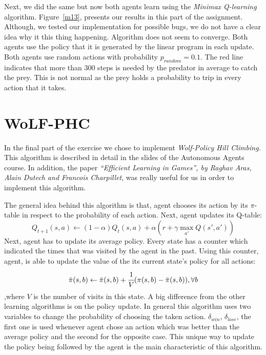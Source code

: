 \documentclass[a4paper,11pt]{article}
\begin{document}
Next, we did the same but now both agents learn using the \textit{Minimax Q-learning} algorithm. Figure~\ref{m13},  presents our results in this part of the assignment. Although, we tested our implementation for possible bugs, we do not have a clear idea why it this thing happening. Algorithm does not seem to converge. Both agents use the policy that it is generated by the linear program in each update. Both agents use random actions with probability $p_{random} = 0.1$. The red line indicates that more than 300 steps is needed by the predator in average to catch the prey. This is not normal as the prey holds a probability to trip in every action that it takes.


\section{WoLF-PHC}
In the final part of the exercise we chose to implement \textit{Wolf-Policy Hill Climbing}. This algorithm is described in detail in the slides of the Autonomous Agents course. In addition, the paper \textit{``Efficient Learning in Games'', by Raghav Aras, Alain Dutech and Francois Charpillet}, was really useful for us in order to implement this algorithm.

The general idea behind this algorithm is that, agent chooses its action by its $\pi$-table in respect to the probability of each action. Next, agent updates its Q-table:
\[
Q_{t+1}(s,a) \leftarrow (1-\alpha)Q_{t}(s,a)+\alpha(r + \gamma \max_{a'}Q(s',a'))
\]
Next, agent has to update its average policy. Every state has a counter which indicated the times that was visited by the agent in the past. Using this counter, agent, is able to update the value of the its current state's policy for all actions:
\[
\bar{\pi}(s,b) \leftarrow \bar{\pi}(s,b) + \cfrac{1}{V} (\pi(s,b) - \bar{\pi}(s,b)), \forall b
\]
,where $V$ is the number of visits in this state. A big difference from the other learning algorithms is on the policy update. In general this algorithm uses two variables to change the probability of choosing the taken action. $\delta_{win}$, $\delta_{lose}$, the first one is used whenever agent chose an action which was better than the average policy and the second for the opposite case. This unique way to update the policy being followed by the agent is the main characteristic of this algorithm.
\end{document}
